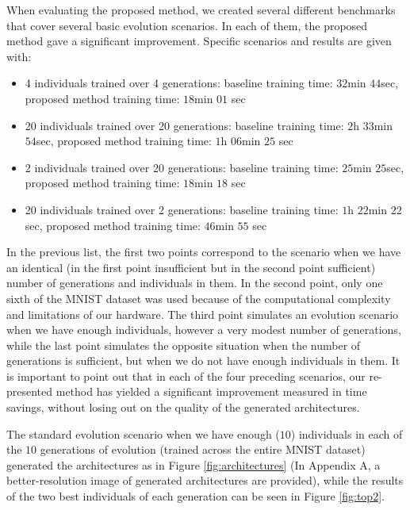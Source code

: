 \documentclass[eng]{simposium}
\begin{document}
When evaluating the proposed method, we created several different benchmarks that cover several basic evolution scenarios.  
In each of them, the proposed method gave a significant improvement.  
Specific scenarios and results are given with: 
\begin{itemize} 
  \item 4 individuals trained over 4 generations: baseline training time: $32$min $44$sec, proposed method training time: $18$min $01$ sec 
  \item 20 individuals trained over 20 generations: baseline training time: $2$h $33$min $54$sec, proposed method training time: $1$h $06$min $25$ sec 
  \item 2 individuals trained over 20 generations: baseline training time: $25$min $25$sec, proposed method training time: $18$min $18$ sec 
  \item 20 individuals trained over 2 generations: baseline training time: $1$h $22$min $22$sec, proposed method training time: $46$min $55$ sec 
\end{itemize} 

In the previous list, the first two points correspond to the scenario when we have an identical  
(in the first point insufficient but in the second point sufficient) number of generations and individuals in them.  
In the second point, only one sixth of the MNIST dataset was used because of the computational complexity and limitations of our hardware.  
The third point simulates an evolution scenario when we have enough individuals, however a very modest number of generations,  
while the last point simulates the opposite situation when the number of generations is sufficient, but when we do not have  
enough individuals in them.  
It is important to point out that in each of the four preceding scenarios, our re-presented method has yielded a significant  
improvement measured in time savings, without losing out on the quality of the generated architectures.  
  

The standard evolution scenario when we have enough ($10$) individuals in each of the $10$ generations of evolution  
(trained across the entire MNIST dataset) generated the architectures as in Figure \ref{fig:architectures}
(In Appendix A, a better-resolution image of generated architectures are provided), 
while the results of the two best individuals of each generation can be seen in Figure \ref{fig:top2}.  
\end{document}
